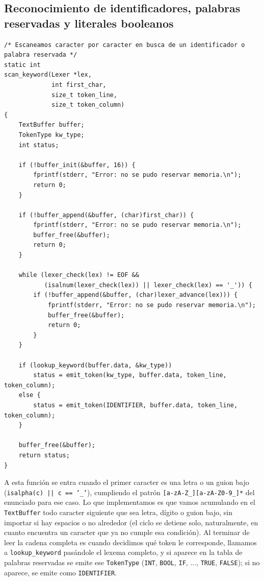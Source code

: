 \documentclass[12pt,letterpaper]{article}
\begin{document}
\subsection*{Reconocimiento de identificadores, palabras reservadas y literales booleanos}

\begin{lstlisting}[style=modernc, caption={Función \texttt{scan\_keyword}.}]
/* Escaneamos caracter por caracter en busca de un identificador o palabra reservada */
static int
scan_keyword(Lexer *lex,
             int first_char,
             size_t token_line,
             size_t token_column)
{
    TextBuffer buffer;
    TokenType kw_type;
    int status;

    if (!buffer_init(&buffer, 16)) {
        fprintf(stderr, "Error: no se pudo reservar memoria.\n");
        return 0;
    }
    
    if (!buffer_append(&buffer, (char)first_char)) {
        fprintf(stderr, "Error: no se pudo reservar memoria.\n");
        buffer_free(&buffer);
        return 0;
    }

    while (lexer_check(lex) != EOF &&
           (isalnum(lexer_check(lex)) || lexer_check(lex) == '_')) {
        if (!buffer_append(&buffer, (char)lexer_advance(lex))) {
            fprintf(stderr, "Error: no se pudo reservar memoria.\n");
            buffer_free(&buffer);
            return 0;
        }
    }

    if (lookup_keyword(buffer.data, &kw_type))
        status = emit_token(kw_type, buffer.data, token_line, token_column);
    else {
        status = emit_token(IDENTIFIER, buffer.data, token_line, token_column);
    }

    buffer_free(&buffer);
    return status;
}
\end{lstlisting}

\bigskip

A esta función se entra cuando el primer caracter es una letra o un guion bajo (\texttt{isalpha(c) || c ==
  '\_'}), cumpliendo el patrón \texttt{[a-zA-Z\_][a-zA-Z0-9\_]*} del enunciado para ese caso. Lo que
implementamos es que vamos acumulando en el \texttt{TextBuffer} todo caracter siguiente que sea letra, dígito o
guion bajo, sin importar si hay espacios o no alrededor (el ciclo se detiene solo, naturalmente, en cuanto
encuentra un caracter que ya no cumple esa condición). Al terminar de leer la cadena completa es cuando
decidimos qué token le corresponde, llamamos a \texttt{lookup\_keyword} pasándole el lexema completo, y si
aparece en la tabla de palabras reservadas se emite ese \texttt{TokenType} (\texttt{INT}, \texttt{BOOL},
\texttt{IF}, ..., \texttt{TRUE}, \texttt{FALSE}); si no aparece, se emite como \texttt{IDENTIFIER}.\\
\end{document}
